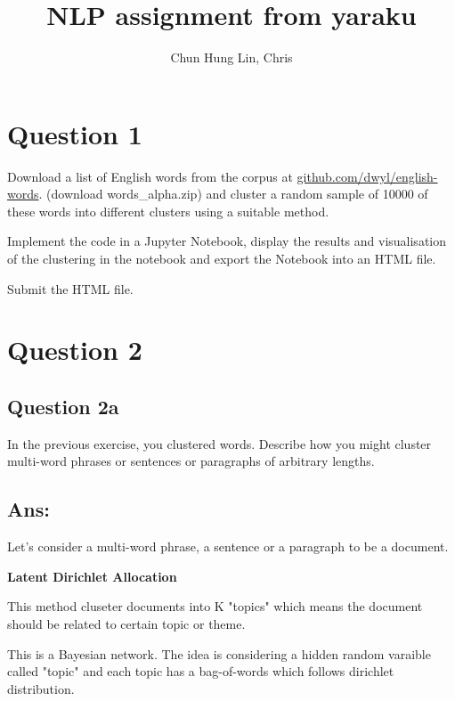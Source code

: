\documentclass{kthreport}
\title{NLP assignment from yaraku}
\author{Chun Hung Lin, Chris}
\begin{document}
\maketitle


\section{Question 1}

Download a list of English words from the corpus at \hspace{0.1em}
\href{https://github.com/dwyl/english-words}{github.com/dwyl/english-words}.
(download words\_alpha.zip) and cluster a random sample of 10000 of
these words into different clusters using a suitable method.

Implement the code in a Jupyter Notebook, display the results and visualisation
of the clustering in the notebook and export the Notebook into an HTML file.

Submit the HTML file.

\section{Question 2}
\subsection{Question 2a}
In the previous exercise, you clustered words.
Describe how you might cluster multi-word phrases or sentences or paragraphs of
arbitrary lengths.

\subsection*{Ans:}

Let's consider a multi-word phrase, a sentence or a paragraph to be a document.

\textbf{Latent Dirichlet Allocation}

This method cluseter documents into K "topics" which means the document should
be related to certain topic or theme.

This is a Bayesian network. The idea is considering a hidden random
varaible called "topic" and each topic has a bag-of-words which follows
dirichlet distribution.
\end{document}

